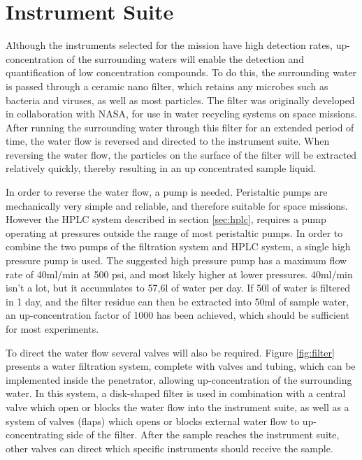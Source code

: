 \chapter{Instrument Suite}

\label{sec:water_flow}
Although the instruments selected for the mission have high detection rates, up-concentration of the surrounding waters will enable the detection and quantification of low concentration compounds. To do this, the surrounding water is passed through a ceramic nano filter, which retains any microbes such as bacteria and viruses, as well as most particles. The filter was originally developed in collaboration with NASA, for use in water recycling systems on space missions. After running the surrounding water through this filter for an extended period of time, the water flow is reversed and directed to the instrument suite. When reversing the water flow, the particles on the surface of the filter will be extracted relatively quickly, thereby resulting in an up concentrated sample liquid.

In order to reverse the water flow, a pump is needed. Peristaltic pumps are mechanically very simple and reliable, and therefore suitable for space missions. However the HPLC system described in section \ref{sec:hplc}, requires a pump operating at pressures outside the range of most peristaltic pumps. In order to combine the two pumps of the filtration system and HPLC system, a single high pressure pump \cite{hplc_motor} is used. The suggested high pressure pump has a maximum flow rate of 40ml/min at 500 psi, and most likely higher at lower pressures. 40ml/min isn't a lot, but it accumulates to 57,6l of water per day. If 50l of water is filtered in 1 day, and the filter residue can then be extracted into 50ml of sample water, an up-concentration factor of 1000 has been achieved, which should be sufficient for most experiments.

To direct the water flow several valves will also be required. Figure \ref{fig:filter} presents a water filtration system, complete with valves and tubing, which can be implemented inside the penetrator, allowing up-concentration of the surrounding water. In this system, a disk-shaped filter is used in combination with a central valve which open or blocks the water flow into the instrument suite, as well as a system of valves (flaps) which opens or blocks external water flow to up-concentrating side of the filter. After the sample reaches the instrument suite, other valves can direct which specific instruments should receive the sample.

